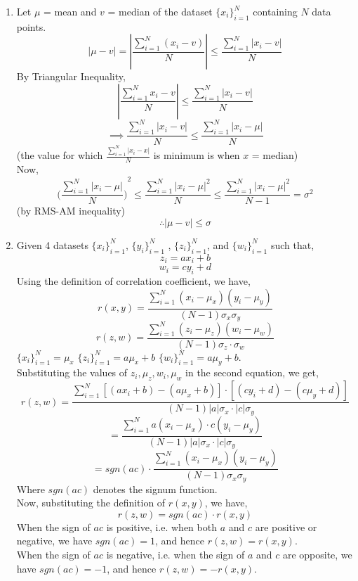 \documentclass[11pt]{article}
\begin{document}
\begin{enumerate}
	\item{
	Let $\mu$ = mean and $v$ = median of the dataset $\{x_i\}_{i=1}^{N}$ containing $N$ data points.
	$$ \left|\mu - v\right| = \left|\frac{\sum_{i=1}^{N}(x_i - v)}{N}\right| \leq \frac{\sum_{i=1}^{N}\left|x_i - v\right|}{N}$$
	By Triangular Inequality,
	$$ \left|\frac{\sum_{i=1}^{N}x_i - v}{N}\right| \leq \frac{\sum_{i=1}^{N}\left|x_i - v\right|}{N} $$ 
	$$ \implies  \frac{\sum_{i=1}^{N}\left|x_i - v\right|}{N} \leq \frac{\sum_{i=1}^{N}\left|x_i - \mu \right|}{N} $$
	\hfill(the value for which $ \frac{\sum_{i=1}^{N}\left|x_i - x\right|}{N} $  is minimum is when $x$ = median) \\
	Now, \\
	$$ {\Big(\frac{\sum_{i=1}^{N}\left|x_i -\mu\right|}{N}\Big)}^2 \leq \frac{\sum_{i=1}^{N}{\left|x_i -\mu\right|}^2}{N} \leq \frac{\sum_{i=1}^{N}{\left|x_i -\mu\right|}^2}{N-1} = \sigma^2 $$ 
	\hfill (by RMS-AM inequality)
	$$ \therefore \left|\mu - v\right| \leq \sigma $$
	} 


	\item {
	Given 4 datasets $\{x_i\}_{i=1}^{N}$, $\{y_i\}_{i=1}^{N}$ , $\{z_i\}_{i=1}^{N}$, and $\{w_i\}_{i=1}^{N}$ such that,
	$$ z_i = ax_i+b $$ $$ w_i = cy_i+d $$ 
	Using the definition of correlation coefficient, we have,
	$$ r(x,y) = \frac{\sum_{i=1}^{N}{(x_i-\mu_x)(y_i-\mu_y)}}{(N-1)\sigma_x\sigma_y} $$
	$$ r(z,w) = \frac{\sum_{i=1}^{N}{(z_i-\mu_z)(w_i-\mu_w)}}{(N-1)\sigma_z \cdot \sigma_w} $$
	 $\{x_i\}_{i=1}^{N} = \mu_x $ $\{z_i\}_{i=1}^{N} = a\mu_x + b$  $\{w_i\}_{i=1}^{N} = a\mu_y + b$.\\

	Substituting the values of $z_i,\mu_z,w_i,\mu_w$ in the second equation, we get, 
	$$
	r(z,w) = \frac{\sum_{i=1}^{N}{[(ax_i+b)-(a\mu_x+b)] \cdot [(cy_i+d)-(c\mu_y+d)]}}{(N-1)\left|a\right|\sigma_x \cdot \left|c\right|\sigma_y} 
	$$
	$$ =  \frac{\sum_{i=1}^{N}{a(x_i-\mu_x) \cdot c(y_i-\mu_y)}}{(N-1)\left|a\right|\sigma_x \cdot \left|c\right|\sigma_y}$$
	$$ =  sgn(ac)\cdot\frac{\sum_{i=1}^{N}{(x_i-\mu_x)(y_i-\mu_y)}}{(N-1)\sigma_x\sigma_y} $$
	Where $sgn(ac)$ denotes the signum function. \\
	Now, substituting the definition of $r(x,y)$, we have, \\
	$$ r(z,w) = sgn(ac) \cdot r(x,y) $$
	When the sign of $ac$ is positive, i.e. when both $a$ and $c$ are positive or negative, we have $sgn(ac) = 1$, and hence $r(z,w) = r(x,y)$. \\
	When the sign of $ac$ is negative, i.e. when the sign of $a$ and $c$ are opposite, we have $sgn(ac) = -1$, and hence $r(z,w) = -r(x,y)$. \\
	}


\end{enumerate}
\end{document}
